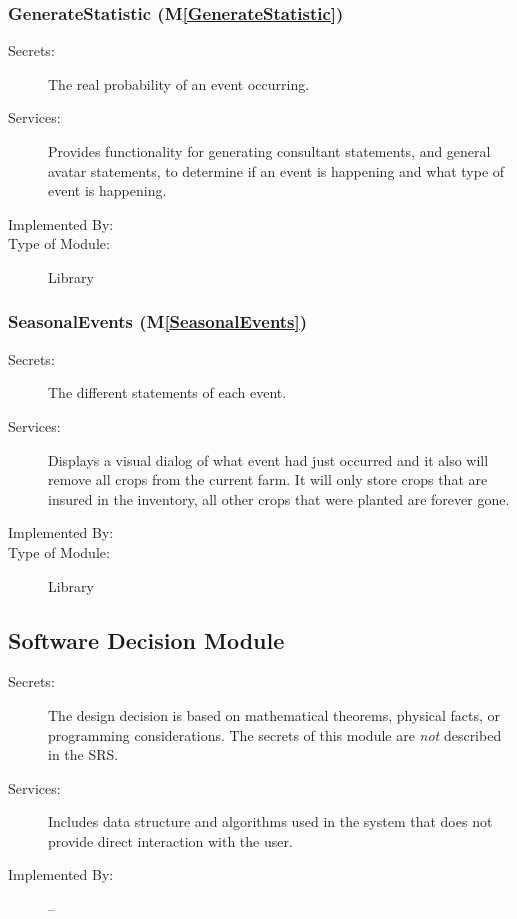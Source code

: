 \documentclass[12pt, titlepage]{article}
\newcommand{\mref}[1]{M\ref{#1}}
\begin{document}
\subsubsection{GenerateStatistic (\mref{GenerateStatistic})}

\begin{description}
\item[Secrets:] The real probability of an event occurring.
\item[Services:] Provides functionality for generating consultant statements, and general avatar statements, to determine if an event is happening and what type of event is happening.
\item[Implemented By:]  \progname
\item[Type of Module:] Library
\end{description}

\subsubsection{SeasonalEvents (\mref{SeasonalEvents})}

\begin{description}
\item[Secrets:] The different statements of each event.
\item[Services:] Displays a visual dialog of what event had just occurred and it also will remove all crops from the current farm. It will only store crops that are insured in the inventory, all other crops that were planted are forever gone.
\item[Implemented By:]  \progname
\item[Type of Module:] Library
\end{description}

\subsection{Software Decision Module}

\begin{description}
\item[Secrets:] The design decision is based on mathematical theorems, physical
  facts, or programming considerations. The secrets of this module are
  \emph{not} described in the SRS.
\item[Services:] Includes data structure and algorithms used in the system that
  does not provide direct interaction with the user. 
\item[Implemented By:] --
\end{description}
\end{document}
